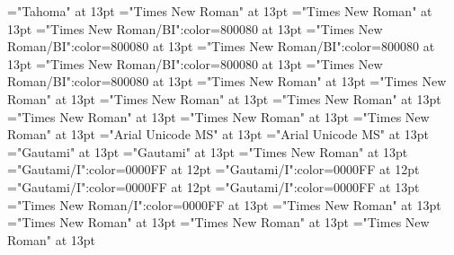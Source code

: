 \documentclass[a4paper]{article}
\begin{document}
\font\spanggofonipaxemicpronunciationggofonipaxemicspanentryletDatadicBody="Tahoma" at 13pt
\font\spanenspanentryletDatadicBody="Times New Roman" at 13pt
\font\sensespanentryletDatadicBody="Times New Roman" at 13pt
\font\grammaticalinfosensespanentryletDatadicBody="Times New Roman/BI":color=800080 at 13pt
\font\grammaticalinfoaftersensespanentryletDatadicBody="Times New Roman/BI":color=800080 at 13pt
\font\partofspeechengrammaticalinfosensespanentryletDatadicBody="Times New Roman/BI":color=800080 at 13pt
\font\spanenpartofspeechengrammaticalinfosensespanentryletDatadicBody="Times New Roman/BI":color=800080 at 13pt
\font\spanengrammaticalinfosensespanentryletDatadicBody="Times New Roman/BI":color=800080 at 13pt
\font{}="Times New Roman" at 13pt
\font\spanendefinitionensensespanentryletDatadicBody="Times New Roman" at 13pt
\font\LexSensepublishStemDefinitionPubensensespanentryletDatadicBody="Times New Roman" at 13pt
\font\spanenLexSensepublishStemDefinitionPubensensespanentryletDatadicBody="Times New Roman" at 13pt
\font\LexSensepublishStemGlossPubLcensensespanentryletDatadicBody="Times New Roman" at 13pt
\font\xitemenLexSensepublishStemGlossPubLcensensespanentryletDatadicBody="Times New Roman" at 13pt
\font\spanenxitemenLexSensepublishStemGlossPubLcensensespanentryletDatadicBody="Times New Roman" at 13pt
\font\xitemhiLexSensepublishStemGlossPubLcensensespanentryletDatadicBody="Arial Unicode MS" at 13pt
\font\spanhixitemhiLexSensepublishStemGlossPubLcensensespanentryletDatadicBody="Arial Unicode MS" at 13pt
\font\xitemteLexSensepublishStemGlossPubLcensensespanentryletDatadicBody="Gautami" at 13pt
\font\spantexitemteLexSensepublishStemGlossPubLcensensespanentryletDatadicBody="Gautami" at 13pt
\font\spansensespanentryletDatadicBody="Times New Roman" at 13pt
\font\exampleggoTeluINspansensespanentryletDatadicBody="Gautami/I":color=0000FF at 12pt
\font\examplebeforespansensespanentryletDatadicBody="Gautami/I":color=0000FF at 12pt
\font\exampleafterspansensespanentryletDatadicBody="Gautami/I":color=0000FF at 12pt
\font\spanggoTeluINexampleggoTeluINspansensespanentryletDatadicBody="Gautami/I":color=0000FF at 13pt
\font\spanenexampleggoTeluINspansensespanentryletDatadicBody="Times New Roman/I":color=0000FF at 13pt
\font\spanspansensespanentryletDatadicBody="Times New Roman" at 13pt
\font\spanspanspansensespanentryletDatadicBody="Times New Roman" at 13pt
\font\CmPossibilitypublishStemTransTypeAbbreviationPubenspanspanspansensespanentryletDatadicBody="Times New Roman" at 13pt
\font\spanenCmPossibilitypublishStemTransTypeAbbreviationPubenspanspanspansensespanentryletDatadicBody="Times New Roman" at 13pt
\end{document}
